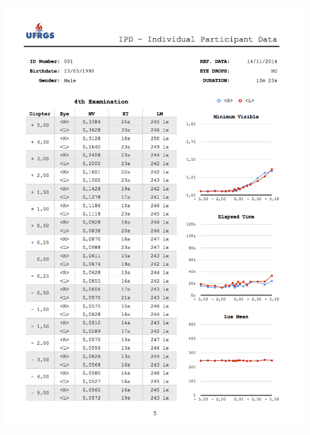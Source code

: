 \begin{figure}[h]
	
	\centering
	\includegraphics[width=1.0\linewidth]{__Images/08/IPD_001_5.png}
\end{figure}

